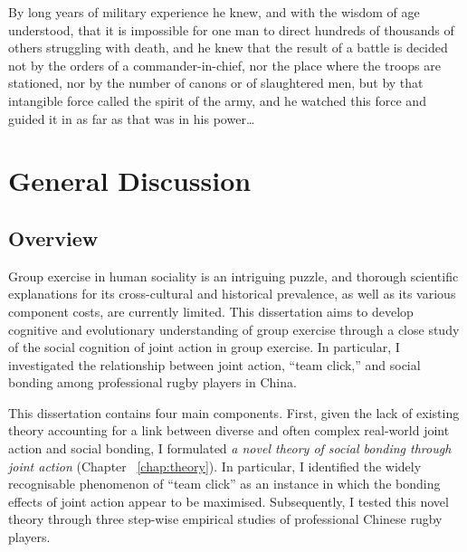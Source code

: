 
\begin{savequote}[8cm]
By long years of military experience he knew, and with the wisdom of age understood, that it is impossible for one man to direct hundreds of thousands of others struggling with death, and he knew that the result of a battle is decided not by the orders of a commander-in-chief, nor the place where the troops are stationed, nor by the number of canons or of slaughtered men, but by that intangible force called the spirit of the army, and he watched this force and guided it in as far as that was in his power\dots
\end{savequote}

\chapter{\label{generalDiscussion}General Discussion}





\section{Overview}


Group exercise in human sociality is an intriguing puzzle, and thorough scientific explanations for its cross-cultural and historical prevalence, as well as its various component costs, are currently limited.  This dissertation aims to develop cognitive and evolutionary understanding of group exercise through a close study of the social cognition of joint action in group exercise.  In particular, I investigated the relationship between joint action, ``team click,'' and social bonding among professional rugby players in China.

This dissertation contains four main components.  First, given the lack of existing theory accounting for a link between diverse and often complex real-world joint action and social bonding, I formulated \textit{a novel theory of social bonding through joint action} (Chapter ~\ref{chap:theory}).  In particular, I identified the widely recognisable phenomenon of ``team click'' as an instance in which the bonding effects of joint action appear to be maximised.  Subsequently, I tested this novel theory through three step-wise empirical studies of professional Chinese rugby players.

